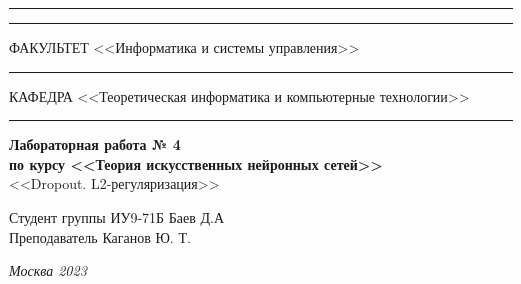 \documentclass[a4paper, 14pt]{extarticle}
\begin{document}
\begin{titlepage}
\vspace{-25pt}
\hspace{-35pt}\rule{\textwidth}{2.3pt}

\vspace*{-20.3pt}
\hspace{-35pt}\rule{\textwidth}{0.4pt}

\vspace{1.5ex}
\hspace{-35pt} \noindent \small ФАКУЛЬТЕТ\hspace{80pt} <<Информатика и системы управления>>

\vspace*{-16pt}
\hspace{47pt}\rule{0.83\textwidth}{0.4pt}

\vspace{0.5ex}
\hspace{-35pt} \noindent \small КАФЕДРА\hspace{50pt} <<Теоретическая информатика и компьютерные технологии>>

\vspace*{-16pt}
\hspace{30pt}\rule{0.866\textwidth}{0.4pt}

\vspace{11em}

\begin{center}
\Large {\bf Лабораторная работа № 4} \\
\large {\bf по курсу <<Теория искусственных нейронных сетей>>} \\
\large <<Dropout. L2-регуляризация>>
\end{center}\normalsize

\vspace{8em}


\begin{flushright}
  {Студент группы ИУ9-71Б Баев Д.А \hspace*{15pt}\\
  \vspace{2ex}
  Преподаватель Каганов Ю. Т.\hspace*{15pt}}
\end{flushright}

\bigskip

\vfill


\begin{center}
\textsl{Москва 2023}
\end{center}
\end{titlepage}
\end{document}
